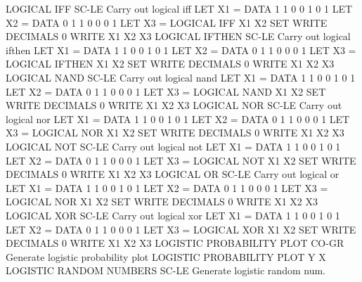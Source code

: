 LOGICAL IFF                 SC-LE Carry out logical iff
                                  LET X1 = DATA 1 1 0 0 1 0 1
                                  LET X2 = DATA 0 1 1 0 0 0 1
                                  LET X3 = LOGICAL IFF X1 X2
                                  SET WRITE DECIMALS 0
                                  WRITE X1 X2 X3
LOGICAL IFTHEN              SC-LE Carry out logical ifthen
                                  LET X1 = DATA 1 1 0 0 1 0 1
                                  LET X2 = DATA 0 1 1 0 0 0 1
                                  LET X3 = LOGICAL IFTHEN X1 X2
                                  SET WRITE DECIMALS 0
                                  WRITE X1 X2 X3
LOGICAL NAND                SC-LE Carry out logical nand
                                  LET X1 = DATA 1 1 0 0 1 0 1
                                  LET X2 = DATA 0 1 1 0 0 0 1
                                  LET X3 = LOGICAL NAND X1 X2
                                  SET WRITE DECIMALS 0
                                  WRITE X1 X2 X3
LOGICAL NOR                 SC-LE Carry out logical nor
                                  LET X1 = DATA 1 1 0 0 1 0 1
                                  LET X2 = DATA 0 1 1 0 0 0 1
                                  LET X3 = LOGICAL NOR X1 X2
                                  SET WRITE DECIMALS 0
                                  WRITE X1 X2 X3
LOGICAL NOT                 SC-LE Carry out logical not
                                  LET X1 = DATA 1 1 0 0 1 0 1
                                  LET X2 = DATA 0 1 1 0 0 0 1
                                  LET X3 = LOGICAL NOT X1 X2
                                  SET WRITE DECIMALS 0
                                  WRITE X1 X2 X3
LOGICAL OR                  SC-LE Carry out logical or
                                  LET X1 = DATA 1 1 0 0 1 0 1
                                  LET X2 = DATA 0 1 1 0 0 0 1
                                  LET X3 = LOGICAL NOR X1 X2
                                  SET WRITE DECIMALS 0
                                  WRITE X1 X2 X3
LOGICAL XOR                 SC-LE Carry out logical xor
                                  LET X1 = DATA 1 1 0 0 1 0 1
                                  LET X2 = DATA 0 1 1 0 0 0 1
                                  LET X3 = LOGICAL XOR X1 X2
                                  SET WRITE DECIMALS 0
                                  WRITE X1 X2 X3
LOGISTIC PROBABILITY PLOT   CO-GR Generate logistic probability plot
                                  LOGISTIC PROBABILITY PLOT Y X
LOGISTIC RANDOM NUMBERS     SC-LE Generate logistic random num.
